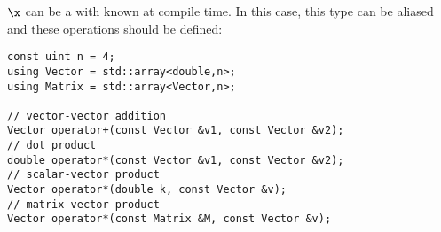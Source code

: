 \documentclass{ecnreport}
\begin{document}
\begin{itemize}
 \end{itemize}

 \newpage
$\x$ can be a  with known  at compile time. In this case, this type can be aliased and these operations should be defined:
\begin{center}\cppstyle
\begin{lstlisting}
const uint n = 4;
using Vector = std::array<double,n>;
using Matrix = std::array<Vector,n>;

// vector-vector addition
Vector operator+(const Vector &v1, const Vector &v2);
// dot product
double operator*(const Vector &v1, const Vector &v2);
// scalar-vector product
Vector operator*(double k, const Vector &v);
// matrix-vector product
Vector operator*(const Matrix &M, const Vector &v);
\end{lstlisting}
\end{center}



 
% 
% 
% 
% 
 
\end{document}
